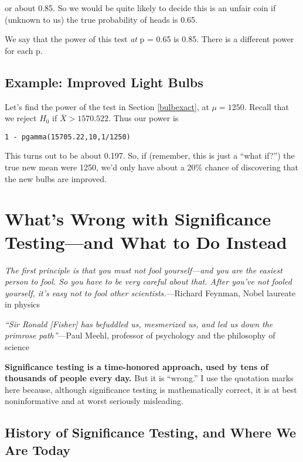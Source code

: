 or about 0.85.  So we would be quite likely to decide this is an unfair
coin if (unknown to us) the true probability of heads is 0.65.

We say that the power of this test {\it at} p = 0.65 is 0.85.  There
is a different power for each p.

\subsection{Example:  Improved Light Bulbs}

Let's find the power of the test in Section \ref{bulbexact}, at
$\mu = 1250$.  Recall that we reject $H_0$ if $\overline{X} > 1570.522$.
Thus our power is

\begin{lstlisting}
1 - pgamma(15705.22,10,1/1250)
\end{lstlisting}

This turns out to be about 0.197.  So, if (remember, this is just a
``what if?'') the true new mean were 1250, we'd only have about a 20\%
chance of discovering that the new bulbs are improved.

\section{What's Wrong with Significance Testing---and What to Do Instead}
\label{whatswrong}

{\it 
The first principle is that you must not fool yourself---and you are
the easiest person to fool. So you have to be very careful about
that. After you've not fooled yourself, it's easy not to fool other
scientists.}---Richard Feynman, Nobel laureate in physics

{\it ``Sir Ronald [Fisher] has befuddled us, mesmerized us, and led us
down the primrose path''}---Paul Meehl, professor of psychology and the
philosophy of science

\bigskip

{\bf Significance testing is a time-honored approach, used by tens of thousands
of people every day.}  But it is ``wrong.'' I use the quotation marks
here because, although significance testing is mathematically correct, it
is at best noninformative and at worst seriously misleading.  

\subsection{History of Significance Testing, and Where We Are Today} 

